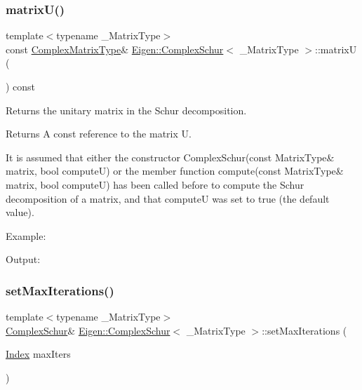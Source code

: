 \subsubsection{\texorpdfstring{matrixU()}{matrixU()}}
{\footnotesize\ttfamily template$<$typename \+\_\+\+Matrix\+Type$>$ \\
const \mbox{\hyperlink{class_eigen_1_1_complex_schur_af61fe57877d51cfb50178f78534042f0}{Complex\+Matrix\+Type}}\& \mbox{\hyperlink{class_eigen_1_1_complex_schur}{Eigen\+::\+Complex\+Schur}}$<$ \+\_\+\+Matrix\+Type $>$\+::matrixU (\begin{DoxyParamCaption}{ }\end{DoxyParamCaption}) const\hspace{0.3cm}{\ttfamily [inline]}}



Returns the unitary matrix in the Schur decomposition. 

\begin{DoxyReturn}{Returns}
A const reference to the matrix U.
\end{DoxyReturn}
It is assumed that either the constructor Complex\+Schur(const Matrix\+Type\& matrix, bool compute\+U) or the member function compute(const Matrix\+Type\& matrix, bool compute\+U) has been called before to compute the Schur decomposition of a matrix, and that {\ttfamily computeU} was set to true (the default value).

Example\+: 
\begin{DoxyCodeInclude}{0}
\end{DoxyCodeInclude}
 Output\+: 
\begin{DoxyVerbInclude}
\end{DoxyVerbInclude}
 \mbox{\label{class_eigen_1_1_complex_schur_a6ca227fbd5387f3a625351354b8eec44}} 
\subsubsection{\texorpdfstring{setMaxIterations()}{setMaxIterations()}}
{\footnotesize\ttfamily template$<$typename \+\_\+\+Matrix\+Type$>$ \\
\mbox{\hyperlink{class_eigen_1_1_complex_schur}{Complex\+Schur}}\& \mbox{\hyperlink{class_eigen_1_1_complex_schur}{Eigen\+::\+Complex\+Schur}}$<$ \+\_\+\+Matrix\+Type $>$\+::set\+Max\+Iterations (\begin{DoxyParamCaption}\item[{\mbox{\hyperlink{class_eigen_1_1_complex_schur_a652104d13723a5b1db2937866a034557}{Index}}}]{max\+Iters }\end{DoxyParamCaption})\hspace{0.3cm}{\ttfamily [inline]}}



